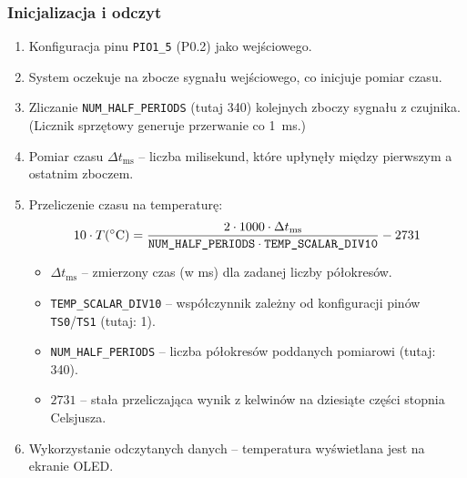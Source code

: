 \subsubsection{Inicjalizacja i odczyt}
\begin{enumerate}
    \item Konfiguracja pinu \texttt{PIO1\_5} (P0.2) jako wejściowego.
    \item System oczekuje na zbocze sygnału wejściowego, co inicjuje pomiar czasu.
    \item Zliczanie \texttt{NUM\_HALF\_PERIODS} (tutaj 340) kolejnych zboczy sygnału z czujnika.\\
    (Licznik sprzętowy generuje przerwanie co 1~ms.)
    \item Pomiar czasu \(\Delta t_{\text{ms}}\) – liczba milisekund, które upłynęły między pierwszym a ostatnim zboczem.
    \item Przeliczenie czasu na temperaturę:
    \[
    10 \cdot T(\degree \mathrm{C}) = \frac{2 \cdot 1000 \cdot \Delta t_{\text{ms}}}{\texttt{NUM\_HALF\_PERIODS} \cdot \texttt{TEMP\_SCALAR\_DIV10}} - 2731
    \]
    \begin{itemize}
        \item \(\Delta t_{\text{ms}}\) – zmierzony czas (w ms) dla zadanej liczby półokresów.
        \item \texttt{TEMP\_SCALAR\_DIV10} – współczynnik zależny od konfiguracji pinów \texttt{TS0}/\texttt{TS1} (tutaj: 1).
        \item \texttt{NUM\_HALF\_PERIODS} – liczba półokresów poddanych pomiarowi (tutaj: 340).
        \item \(2731\) – stała przeliczająca wynik z kelwinów na dziesiąte części stopnia Celsjusza.
    \end{itemize}
    \item Wykorzystanie odczytanych danych – temperatura wyświetlana jest na ekranie OLED.
\end{enumerate}

